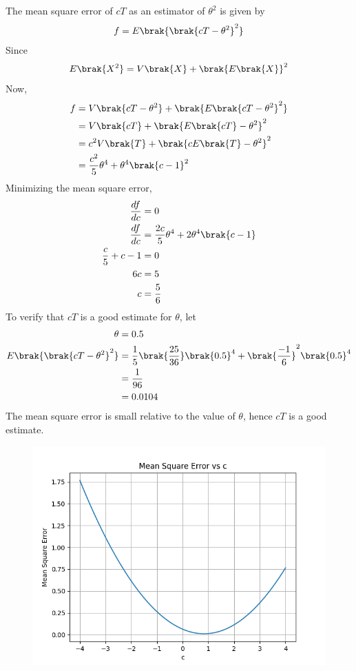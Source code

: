 \documentclass[journal,12pt,onecolumn]{IEEEtran}
\theoremstyle{remark}
\begin{document}
The mean square error of $cT$ as an estimator of $\theta^2$ is given by
\begin{align}
	f = E\brak{\brak{cT - \theta^2}^2}
\end{align}
Since
\begin{align}
	E\brak{X^2} = V\brak{X} + \brak{E\brak{X}}^2
\end{align}
Now,
\begin{align}
	f &= V\brak{cT - \theta^2} + \brak{E\brak{cT - \theta^2}^2}\\
	&= V\brak{cT} + \brak{E\brak{cT} - \theta^2}^2\\
	&= c^2V\brak{T} + \brak{cE\brak{T} - \theta^2}^2\\
	&= \frac{c^2}{5}\theta^4 + \theta^4\brak{c-1}^2
\end{align}
Minimizing the mean square error,
\begin{align}
	\frac{df}{dc} &= 0\\
	\frac{df}{dc} &= \frac{2c}{5}\theta^4 + 2\theta^4\brak{c-1}\\
	\frac{c}{5} + c - 1 &= 0\\
	6c &= 5\\
	c &= \frac{5}{6}
\end{align}
To verify that $cT$ is a good estimate for $\theta$, let
\begin{align}
	\theta &= 0.5\\
	E\brak{\brak{cT - \theta^2}^2} &= \frac{1}{5}\brak{\frac{25}{36}}\brak{0.5}^4 + \brak{\frac{-1}{6}}^2\brak{0.5}^4\\
	&= \frac{1}{96}\\
	&= 0.0104
\end{align}
The mean square error is small relative to the value of $\theta$, hence $cT$ is a good estimate.
\\
\begin{figure}[!ht]
	\centering
	\includegraphics[width = \columnwidth]{2023/ST/40/figs/fig1.png}
\end{figure}
\end{document}
